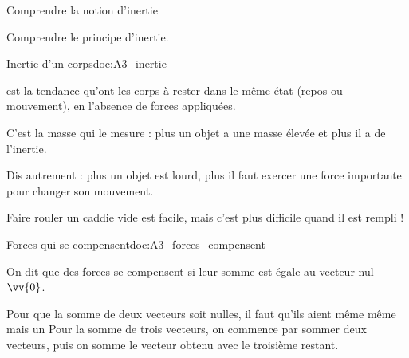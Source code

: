 \teteSndMouv


\vspace*{-32pt}


\begin{objectifs}
  \item Comprendre la notion d'inertie
  \item Comprendre le principe d'inertie.
\end{objectifs}


\begin{doc}{Inertie d'un corps}{doc:A3_inertie}
  \begin{importants}
     est la tendance qu'ont les corps à rester dans le même état (repos ou mouvement), en l'absence de forces appliquées.
  \end{importants}
    
  \fleche C'est la masse qui le mesure : plus un objet a une masse élevée et plus il a de l'inertie.
  
  \fleche Dis autrement : plus un objet est lourd, plus il faut exercer une force importante pour changer son mouvement.
  
  \exemple Faire rouler un caddie vide est facile, mais c'est plus difficile quand il est rempli !
\end{doc}


\begin{doc}{Forces qui se compensent}{doc:A3_forces_compensent}
  \begin{importants} 
    On dit que des forces se compensent si leur somme est égale au vecteur nul $\vv{0}$.
  \end{importants}
  Pour que la somme de deux vecteurs soit nulles, il faut qu'ils aient même  même  mais un 
  Pour la somme de trois vecteurs, on commence par sommer deux vecteurs, puis on somme le vecteur obtenu avec le troisième restant.
  
  \centering
\end{doc}





